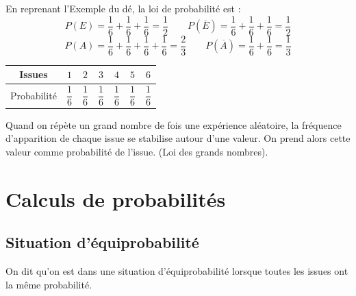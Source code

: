 \begin{Exemple}
\begin{minipage}[c]{0.5\linewidth}
En reprenant l'Exemple du dé, la loi de probabilité est :
$$P(E)=\dfrac{1}{6}+\dfrac{1}{6}+\dfrac{1}{6}=\dfrac{1}{2}\quad \quad P(\overline{E})=\dfrac{1}{6}+\dfrac{1}{6}+\dfrac{1}{6}=\dfrac{1}{2}$$
$$P(A)=\dfrac{1}{6}+\dfrac{1}{6}+\dfrac{1}{6}+\dfrac{1}{6}=\dfrac{2}{3}\quad \quad P(\overline{A})=\dfrac{1}{6}+\dfrac{1}{6}=\dfrac{1}{3}$$
\end{minipage} \hfill
\begin{minipage}[c]{0.4\linewidth}
\renewcommand{\arraystretch}{2.5}
\begin{tabular}{|c|c|c|c|c|c|c|}
\hline
Issues & $1$ & $2$ & $3$ & $4$ & $5$ & $6$ \\
\hline
Probabilité & $\dfrac{1}{6}$ & $\dfrac{1}{6}$ & $\dfrac{1}{6}$ & $\dfrac{1}{6}$ & $\dfrac{1}{6}$ & $\dfrac{1}{6}$ \\
\hline
\end{tabular}
\end{minipage}


\end{Exemple}
\vspace{0.3cm}

\begin{Remarque}
Quand on répète un grand nombre de fois une expérience aléatoire, la fréquence d'apparition de chaque issue se stabilise autour d’une valeur. On prend alors cette valeur comme probabilité de l'issue. (Loi des grands nombres).
\end{Remarque}


\vspace{0.5cm}

\section{Calculs de probabilités}
\subsection{Situation d'équiprobabilité}

\vspace{0.3cm}

\begin{Définition}
On dit qu'on est dans une situation d'équiprobabilité lorsque toutes les issues ont la même probabilité.
\end{Définition}

\vspace{0.3cm}

